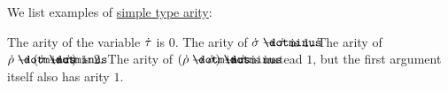 \begin{example}\label{ex:def:simple_type_arity}
  We list examples of \hyperref[def:simple_type_arity]{simple type arity}:
  \begin{thmenum}
     The arity of the variable \( \dot{\tau} \) is \( 0 \).
     The arity of \( \syn\sigma \synimplies \syn\tau \) is \( 1 \).
     The arity of \( \syn\rho \synimplies (\syn\sigma \synimplies \syn\tau) \) is \( 2 \).
     The arity of \( (\syn\rho \synimplies \syn\sigma) \synimplies \syn\tau \) is instead \( 1 \), but the first argument itself also has arity \( 1 \).
  \end{thmenum}
\end{example}


